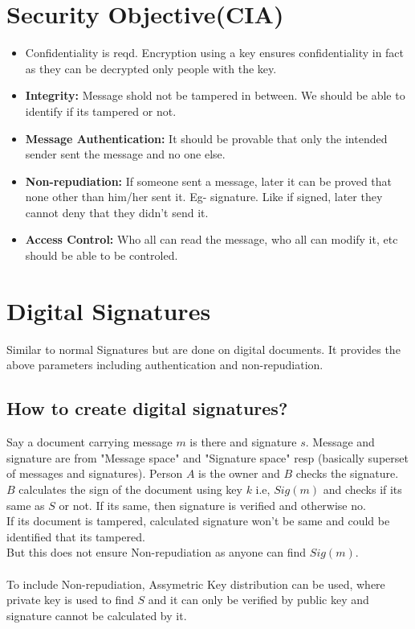\documentclass[english, 11pt]{article}
\begin{document}
\section*{Security Objective(CIA)}
\begin{itemize}
  \item Confidentiality is reqd. Encryption using a key ensures confidentiality in fact as they can be decrypted only people with the key.
  \item \textbf{Integrity:} Message shold not be tampered in between. We should be able to identify if its tampered or not.
  \item \textbf{Message Authentication:} It should be provable that only the intended sender sent the message and no one else.
  \item \textbf{Non-repudiation:} If someone sent a message, later it can be proved that none other than him/her sent it. Eg- signature. Like if signed, later they cannot deny that they didn't send it.
  \item \textbf{Access Control:} Who all can read the message, who all can modify it, etc should be able to be controled.
\end{itemize}

\section*{Digital Signatures}
Similar to normal Signatures but are done on digital documents. It provides the above parameters including authentication and non-repudiation.
\subsection*{How to create digital signatures?}
Say a document carrying message $m$ is there and signature $s$. Message and signature are from "Message space" and "Signature space" resp (basically superset of messages and signatures).
Person $A$ is the owner and $B$ checks the signature. \\
$B$ calculates the sign of the document using key $k$ i.e, $Sig(m)$ and checks if its same as $S$ or not. If its same, then signature is verified and otherwise no.\\
If its document is tampered, calculated signature won't be same and could be identified that its tampered.\\
But this does not ensure Non-repudiation as anyone can find $Sig(m)$.\\ \\
To include Non-repudiation, Assymetric Key distribution can be used, where private key is used to find $S$ and it can only be verified by public key and signature cannot be calculated by it.
\end{document}
